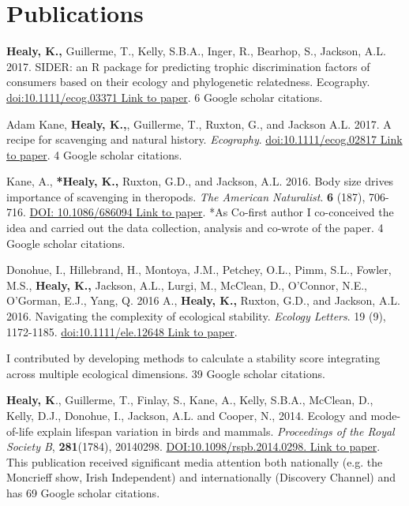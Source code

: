 \documentclass[10pt,a4paper]{article}
\begin{document}
\section{Publications}
\begin{flushleft}


\setlength{\parindent}{0mm}\textbf{Healy, K.,} Guillerme, T., Kelly, S.B.A., Inger, R., Bearhop, S., Jackson, A.L. 2017. SIDER: an R package for predicting trophic discrimination factors of consumers based on their ecology and phylogenetic relatedness. Ecography. \href{https://onlinelibrary.wiley.com/doi/abs/10.1111/ecog.03371}{doi:10.1111/ecog.03371 Link to paper}. 6 Google scholar citations.
\bigskip

\setlength{\parindent}{0mm} Adam Kane, \textbf{Healy, K.,}, Guillerme, T., Ruxton, G., and Jackson A.L. 2017. A recipe for scavenging and natural history. \textit{Ecography}. \href{https://onlinelibrary.wiley.com/doi/pdf/10.1111/ecog.02817}{doi:10.1111/ecog.02817 Link to paper}. 4 Google scholar citations.
\bigskip


\setlength{\parindent}{0mm}Kane, A., \textbf{*Healy, K.,} Ruxton, G.D., and Jackson, A.L. 2016. Body size drives importance of scavenging in theropods. \textit{The American Naturalist}. \textbf{6} (187), 706-716. \href{https://www.researchgate.net/profile/Kevin_Healy/publication/301279301_Body_Size_as_a_Driver_of_Scavenging_in_Theropod_Dinosaurs/links/570f8b2a08ae38897ba19c35.pdf.}{DOI: 10.1086/686094 Link to paper}. *As Co-first author I co-conceived the idea and carried out the data collection, analysis and co-wrote of the paper. 4 Google scholar citations.

\bigskip

\setlength{\parindent}{0mm}Donohue, I., Hillebrand, H., Montoya, J.M., Petchey, O.L., Pimm, S.L., Fowler, M.S., \textbf{Healy, K.,} Jackson, A.L., Lurgi, M., McClean, D., O'Connor, N.E., O'Gorman, E.J., Yang, Q. 2016
 A., \textbf{Healy, K.,} Ruxton, G.D., and Jackson, A.L. 2016. Navigating the complexity of ecological stability. \textit{Ecology Letters}. 19 (9), 1172-1185. \href{https://onlinelibrary.wiley.com/doi/abs/10.1111/ele.12648}{doi:10.1111/ele.12648 Link to paper}.
\par{\fontsize{10.5}{10} I contributed by developing methods to calculate a stability score integrating across multiple ecological dimensions. 39 Google scholar citations.}


\bigskip

\textbf{Healy, K}., Guillerme, T., Finlay, S., Kane, A., Kelly, S.B.A., McClean, D., Kelly, D.J., Donohue, I., Jackson, A.L. and Cooper, N., 2014. Ecology and mode-of-life explain lifespan variation in birds and mammals. \textit{Proceedings of the Royal Society B}, \textbf{281}(1784), 20140298. \href{http://rspb.royalsocietypublishing.org/content/281/1784/20140298}{DOI:10.1098/rspb.2014.0298. Link to paper}. This publication received significant media attention both nationally (e.g. the Moncrieff show, Irish Independent) and internationally (Discovery Channel) and has 69 Google scholar citations.


\end{flushleft}
\end{document}
